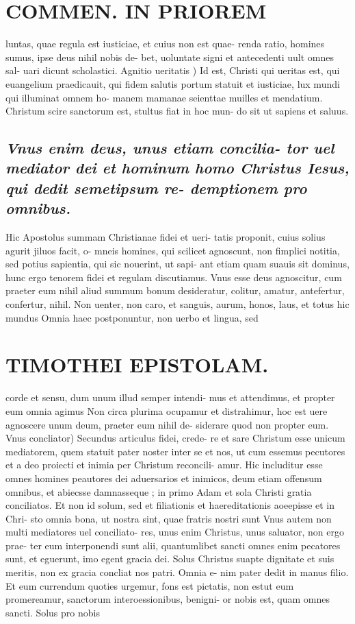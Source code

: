 \documentclass{article}
\begin{document}
\begin{pages}
\section*{COMMEN. IN PRIOREM }
\marginpar{[ p.48 ]}\pstart luntas, quae regula est iusticiae, et cuius non est quae- renda ratio, homines sumus, ipse deus nihil nobis de- bet, uoluntate signi et antecedenti uult omnes sal- uari dicunt scholastici.  \pend\pstart Agnitio ueritatis ) Id est, Christi qui ueritas est, qui euangelium praedicauit, qui fidem salutis portum statuit et iusticiae, lux mundi qui illuminat omnem ho- manem mamanae seienttae muilles et mendatium. Christum scire sanctorum est, stultus fiat in hoc mun- do sit ut sapiens et saluus.  \pend
{}
{}
\subsection*{\textit{Vnus enim deus, unus etiam concilia- tor uel mediator dei et hominum homo Christus Iesus, qui dedit semetipsum re- demptionem pro omnibus. }}\pstart Hic Apostolus summam Christianae fidei et ueri- tatis proponit, cuius solius agurit jiluos facit, o- mneis homines, qui scilicet agnoscunt, non fimplici notitia, sed potius sapientia, qui sic nouerint, ut sapi- ant etiam quam suauis sit dominus, hunc ergo tenorem fidei et regulam discutiamus.  \pend\pstart Vnus esse deus agnoscitur, cum praeter eum nihil aliud summum bonum desideratur, colitur, amatur, antefertur, confertur, nihil. Non uenter, non caro, et sanguis, aurum, honos, laus, et totus hic mundus Omnia haec postponuntur, non uerbo et lingua, sed  \pend
\section*{TIMOTHEI EPISTOLAM. }
\marginpar{[ p.49 ]}\pstart corde et sensu, dum unum illud semper intendi- mus et attendimus, et propter eum omnia agimus Non circa plurima ocupamur et distrahimur, hoc est uere agnoscere unum deum, praeter eum nihil de- siderare quod non propter eum.  \pend\pstart Vnus concliator) Secundus articulus fidei, crede- re et sare Christum esse unicum mediatorem, quem statuit pater noster inter se et nos, ut cum essemus pecutores et a deo proiecti et inimia per Christum reconcili- amur. Hic includitur esse omnes homines peautores dei aduersarios et inimicos, deum etiam offensum omnibus, et abiecsse damnasseque ; in primo Adam et sola Christi gratia conciliatos. Et non id solum, sed et filiationis et haereditationis aoeepisse et in Chri- sto omnia bona, ut nostra sint, quae fratris nostri sunt Vnus autem non multi mediatores uel conciliato- res, unus enim Christus, unus saluator, non ergo prae- ter eum interponendi sunt alii, quantumlibet sancti omnes enim pecatores sunt, et eguerunt, imo egent gracia dei. Solus Christus suapte dignitate et suis meritis, non ex gracia concliat nos patri. Omnia e- nim pater dedit in manus filio. Et eum currendum quoties urgemur, fons est pictatis, non estut eum promereamur, sanctorum interoessionibus, benigni- or nobis est, quam omnes sancti. Solus pro nobis  \pend

\end{pages}
\end{document}
